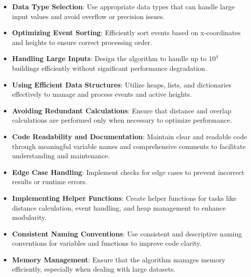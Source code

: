 \begin{itemize}
    \item \textbf{Data Type Selection}: Use appropriate data types that can handle large input values and avoid overflow or precision issues.
    
    \item \textbf{Optimizing Event Sorting}: Efficiently sort events based on x-coordinates and heights to ensure correct processing order.
    
    \item \textbf{Handling Large Inputs}: Design the algorithm to handle up to \(10^4\) buildings efficiently without significant performance degradation.
    
    \item \textbf{Using Efficient Data Structures}: Utilize heaps, lists, and dictionaries effectively to manage and process events and active heights.
    
    \item \textbf{Avoiding Redundant Calculations}: Ensure that distance and overlap calculations are performed only when necessary to optimize performance.
    
    \item \textbf{Code Readability and Documentation}: Maintain clear and readable code through meaningful variable names and comprehensive comments to facilitate understanding and maintenance.
    
    \item \textbf{Edge Case Handling}: Implement checks for edge cases to prevent incorrect results or runtime errors.
    
    \item \textbf{Implementing Helper Functions}: Create helper functions for tasks like distance calculation, event handling, and heap management to enhance modularity.
    
    \item \textbf{Consistent Naming Conventions}: Use consistent and descriptive naming conventions for variables and functions to improve code clarity.
    
    \item \textbf{Memory Management}: Ensure that the algorithm manages memory efficiently, especially when dealing with large datasets.
    

\end{itemize}
